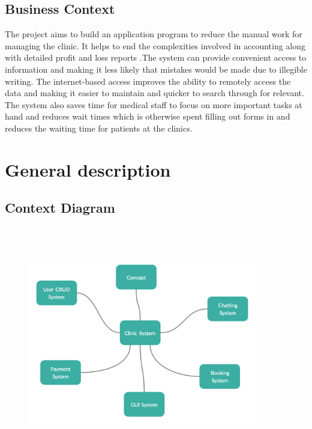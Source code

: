 \documentclass[]{article}
\begin{document}
\subsection{Business Context}

The project aims to build an application program to reduce the manual work for managing the clinic. It helps to end the complexities involved in accounting along with detailed profit and loss reports .The system can provide convenient access to information and making it less likely that mistakes would be made due to illegible writing. The internet-based access improves the ability to remotely access the data and making it easier to maintain and quicker to search through for relevant. The system also saves time for medical staff to focus on more important tasks at hand and reduces wait times which is otherwise spent filling out forms in and reduces the waiting time for patients at the clinics.


\section{General description}
\subsection{Context Diagram}
\FloatBarrier
\begin{figure}[h]
\centering
\includegraphics[width=10.0cm, height=10.0cm]{./context diagram.png}
\label{label1}
\end{figure}
\FloatBarrier
\newpage
\end{document}
